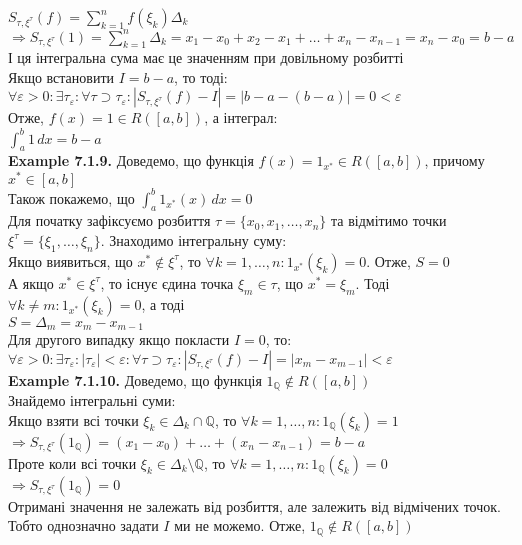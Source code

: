 \documentclass[a4paper, 14pt]{extarticle}
\def\huge{\displaystyle}
\def\bigline{\vspace{5mm}\\}
\def\ex#1{\textbf{Example {#1}}}
\def\bigline{\vspace{5mm}\\}
\begin{document}
$S_{\tau, \xi^\tau} (f) = \huge \sum_{k=1}^n f(\xi_k) \Delta_k$\\
$\Rightarrow S_{\tau, \xi^\tau} (1) = \huge \sum_{k=1}^n \Delta_k = x_1 - x_0 + x_2 - x_1 + \dots + x_n - x_{n-1} = x_n - x_0 = b - a$\\
І ця інтегральна сума має це значенням при довільному розбитті\\
Якщо встановити $I = b -a$, то тоді:\\
$\forall \varepsilon > 0: \exists \tau_{\varepsilon}: \forall \tau \supset \tau_{\varepsilon}: |S_{\tau, \xi^{\tau}}(f) - I| = |b-a - (b-a)| = 0 < \varepsilon$\\
Отже, $f(x) = 1 \in R([a,b])$, а інтеграл:\\
$\huge \int_a^b 1\,dx = b-a$
\bigline
\ex{7.1.9.} Доведемо, що функція $f(x) = 1_{x^*} \in R([a,b])$, причому $x^* \in [a,b]$\\
Також покажемо, що $\huge \int_a^b 1_{x^*} (x)\,dx = 0$\\
Для початку зафіксуємо розбиття $\tau = \{x_0,x_1,\dots,x_n\}$ та відмітимо точки $\xi^\tau = \{\xi_1,\dots,\xi_n\}$. Знаходимо інтегральну суму:\\
Якщо виявиться, що $x^* \not \in \xi^\tau$, то $\forall k = 1,\dots, n: 1_{x^*}(\xi_k) = 0$. Отже, $S = 0$\\
А якщо $x^* \in \xi^\tau$, то існує єдина точка $\xi_m \in \tau$, що $x^* = \xi_m$. Тоді $\forall k \neq m: 1_{x^*}(\xi_k) = 0$, а тоді\\
$S = \Delta_m = x_m - x_{m-1}$\\
Для другого випадку якщо покласти $I = 0$, то:\\
$\forall \varepsilon > 0: \exists \tau_{\varepsilon}: |\tau_\varepsilon| < \varepsilon: \forall \tau \supset \tau_\varepsilon: |S_{\tau,\xi^\tau}(f) - I| = |x_m - x_{m-1}| < \varepsilon$
\bigline
\ex{7.1.10.} Доведемо, що функція $1_{\mathbb{Q}} \not \in R([a,b])$\\
Знайдемо інтегральні суми:\\
Якщо взяти всі точки $\xi_k \in \Delta_k \cap \mathbb{Q}$, то $\forall k = 1,\dots,n: 1_{\mathbb{Q}}(\xi_k) = 1$\\
$\Rightarrow S_{\tau, \xi^\tau}(1_{\mathbb{Q}}) = (x_1-x_0)+\dots+(x_n-x_{n-1}) = b-a$\\
Проте коли всі точки $\xi_k \in \Delta_k \setminus \mathbb{Q}$, то $\forall k = 1,\dots,n: 1_{\mathbb{Q}}(\xi_k) = 0$\\
$\Rightarrow S_{\tau, \xi^\tau}(1_{\mathbb{Q}}) = 0$\\
Отримані значення не залежать від розбиття, але залежить від відмічених точок. Тобто однозначно задати $I$ ми не можемо. Отже, $1_{\mathbb{Q}} \not \in R([a,b])$
\bigline
\end{document}
